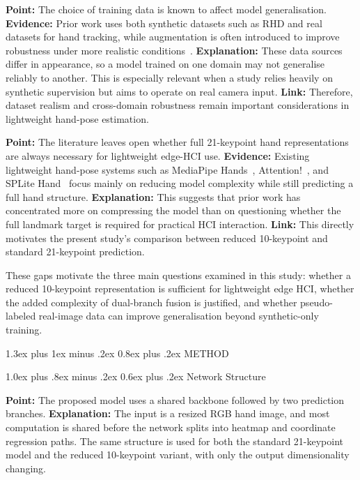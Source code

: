 \documentclass[10pt,letterpaper]{article}
\makeatletter
\renewcommand\section{\@startsection{section}{1}{\z@}%
  {1.3ex plus 1ex minus .2ex}%
  {0.8ex plus .2ex}%
  {\centering\normalfont\small\scshape}}
\renewcommand\subsection{\@startsection{subsection}{2}{\z@}%
  {1.0ex plus .8ex minus .2ex}%
  {0.6ex plus .2ex}%
  {\normalfont\itshape}}
\makeatother
\begin{document}
\medskip
\noindent\textbf{Point:} The choice of training data is known to affect model generalisation.  
\textbf{Evidence:} Prior work uses both synthetic datasets such as RHD and real datasets for hand tracking, while augmentation is often introduced to improve robustness under more realistic conditions~\cite{handobjectgcn,lightweightgcnhand,handaugment}.  
\textbf{Explanation:} These data sources differ in appearance, so a model trained on one domain may not generalise reliably to another. This is especially relevant when a study relies heavily on synthetic supervision but aims to operate on real camera input.  
\textbf{Link:} Therefore, dataset realism and cross-domain robustness remain important considerations in lightweight hand-pose estimation.

\medskip
\noindent\textbf{Point:} The literature leaves open whether full 21-keypoint hand representations are always necessary for lightweight edge-HCI use.  
\textbf{Evidence:} Existing lightweight hand-pose systems such as MediaPipe Hands~\cite{mediapipe}, Attention!~\cite{attentionlite}, and SPLite Hand~\cite{splitehand} focus mainly on reducing model complexity while still predicting a full hand structure.  
\textbf{Explanation:} This suggests that prior work has concentrated more on compressing the model than on questioning whether the full landmark target is required for practical HCI interaction.  
\textbf{Link:} This directly motivates the present study's comparison between reduced 10-keypoint and standard 21-keypoint prediction.

\medskip
These gaps motivate the three main questions examined in this study: whether a reduced 10-keypoint representation is sufficient for lightweight edge HCI, whether the added complexity of dual-branch fusion is justified, and whether pseudo-labeled real-image data can improve generalisation beyond synthetic-only training.


\section{METHOD}

\subsection{Network Structure}

\noindent\textbf{Point:} The proposed model uses a shared backbone followed by two prediction branches.  
\textbf{Explanation:} The input is a resized RGB hand image, and most computation is shared before the network splits into heatmap and coordinate regression paths. The same structure is used for both the standard 21-keypoint model and the reduced 10-keypoint variant, with only the output dimensionality changing.
\end{document}
